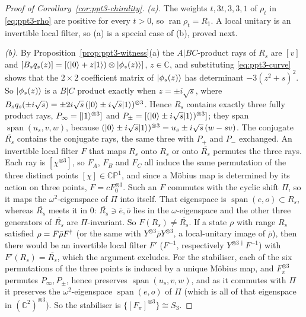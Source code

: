 \begin{proof}[Proof of Corollary~\ref{cor:ppt3-chirality}]
\emph{(a).} The weights $t,3t,3,3,1$ of $\rho_t$ in \eqref{eq:ppt3-rho} are positive for every $t>0$, so
$\operatorname{ran}\rho_t=R_1$. A local unitary is an invertible local filter, so (a) is a special case of (b), proved next.

\emph{(b).} By Proposition~\ref{prop:ppt3-witness}(a) the $A|BC$-product rays of $R_s$ are $[v]$ and
$[B_sq_s(z)]=[(\lvert0\rangle+z\lvert1\rangle)\otimes\lvert\phi_s(z)\rangle]$, $z\in\mathbb C$, and substituting \eqref{eq:ppt3-curve} shows that the $2\times2$
coefficient matrix of $\lvert\phi_s(z)\rangle$ has determinant $-3(z^2+s)^2$. So $\lvert\phi_s(z)\rangle$ is a $B|C$ product exactly when
$z=\pm i\sqrt s$, where $B_sq_s(\pm i\sqrt s)=\pm2i\sqrt s\,(\lvert0\rangle\pm i\sqrt s\lvert1\rangle)^{\otimes3}$. Hence $R_s$ contains exactly three fully
product rays, $P_\infty=[\lvert1\rangle^{\otimes3}]$ and $P_\pm=[(\lvert0\rangle\pm i\sqrt s\lvert1\rangle)^{\otimes3}]$; they span $\operatorname{span}(u_s,v,w)$, because
$(\lvert0\rangle\pm i\sqrt s\lvert1\rangle)^{\otimes3}=u_s\pm i\sqrt s\,(w-sv)$. The conjugate $\overline{R_s}$ contains the conjugate rays, the same three with $P_+$ and $P_-$ exchanged. An invertible
local filter $F$ that maps $R_s$ onto $R_s$ or onto $\overline{R_s}$ permutes the three rays. Each ray is $[\chi^{\otimes3}]$, so $F_A$,
$F_B$ and $F_C$ all induce the same permutation of the three distinct points $[\chi]\in\mathbb{CP}^1$, and since a M\"obius map is determined by its action on three
points, $F=cF_0^{\otimes3}$. Such an $F$ commutes with the cyclic shift $\Pi$, so it maps the $\omega^2$-eigenspace of $\Pi$ into itself. That eigenspace is
$\operatorname{span}(e,o)\subset R_s$, whereas $\overline{R_s}$ meets it in $0$: $\overline{R_s}\ni\bar e,\bar o$ lies in the $\omega$-eigenspace and the other three
generators of $\overline{R_s}$ are $\Pi$-invariant. So $F(R_s)\ne\overline{R_s}$. If a state $\rho$ with range $R_s$ satisfied $\rho=F\bar\rho F^{\dagger}$ (or the same with $Y^{\otimes3}\bar\rho Y^{\otimes3}$, a local-unitary image of $\bar\rho$), then
there would be an invertible local filter $F'$ ($F^{-1}$, respectively $Y^{\otimes3\dagger}F^{-1}$) with $F'(R_s)=\overline{R_s}$, which the argument excludes. For the stabiliser, each of the six permutations of the three points is
induced by a unique M\"obius map, and $F_\pi^{\otimes3}$ permutes $P_\infty,P_\pm$, hence preserves $\operatorname{span}(u_s,v,w)$, and as it commutes with $\Pi$ it preserves
the $\omega^2$-eigenspace $\operatorname{span}(e,o)$ of $\Pi$ (which is all of that eigenspace in $(\mathbb C^2)^{\otimes3}$). So the stabiliser is $\{[F_\pi]^{\otimes3}\}\cong S_3$.

\end{proof}

